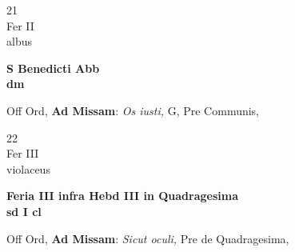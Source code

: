 \documentclass[10pt, openany]{book}
\begin{document}
        \begin{center}
            \begin{minipage}{3.5in}
                \vspace{2em}
                \begin{minipage}{0.5in}
                    {\Huge 21} \\
                    {\normalsize Fer II} \\
                    {\normalsize albus}
                \end{minipage}
                \begin{minipage}{3.0in}
                    \textbf{ \large S Benedicti Abb \\
                    \textnormal{\normalsize dm}} \\ 
                \end{minipage}
                \begin{justify}Off Ord, \textbf{Ad Missam}: \textit{Os iusti,} G, Pre Communis,   
                \end{justify}
            \end{minipage}
        \end{center}
    
        \begin{center}
            \begin{minipage}{3.5in}
                \vspace{2em}
                \begin{minipage}{0.5in}
                    {\Huge 22} \\
                    {\normalsize Fer III} \\
                    {\normalsize violaceus}
                \end{minipage}
                \begin{minipage}{3.0in}
                    \textbf{ \large Feria III infra Hebd III in Quadragesima \\
                    \textnormal{\normalsize sd I cl}} \\ 
                \end{minipage}
                \begin{justify}Off Ord, \textbf{Ad Missam}: \textit{Sicut oculi,} Pre de Quadragesima,   
                \end{justify}
            \end{minipage}
        \end{center}
    
\end{document}
